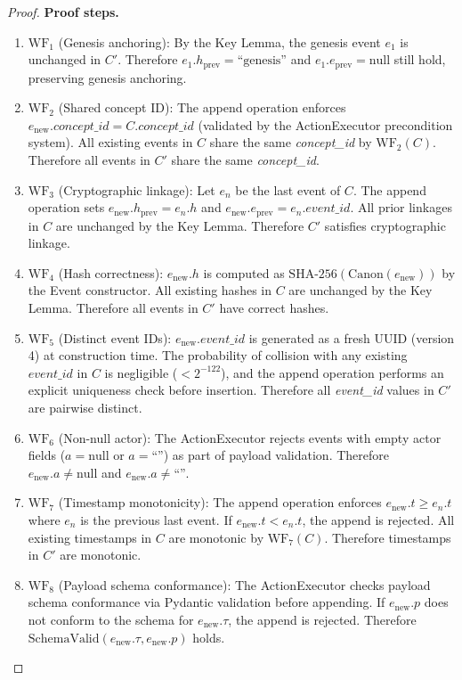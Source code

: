 \begin{proof}
\textbf{Proof steps.}
\begin{enumerate}[label=Step~\arabic*:,leftmargin=2em]
    \item $\text{WF}_1$ (Genesis anchoring): By the Key Lemma, the genesis event $e_1$ is unchanged in $C'$. Therefore $e_1.h_{\text{prev}} = \text{``genesis''}$ and $e_1.e_{\text{prev}} = \text{null}$ still hold, preserving genesis anchoring.
    \item $\text{WF}_2$ (Shared concept ID): The append operation enforces $e_{\text{new}}.\textit{concept\_id} = C.\textit{concept\_id}$ (validated by the ActionExecutor precondition system). All existing events in $C$ share the same \textit{concept\_id} by $\text{WF}_2(C)$. Therefore all events in $C'$ share the same \textit{concept\_id}.
    \item $\text{WF}_3$ (Cryptographic linkage): Let $e_n$ be the last event of $C$. The append operation sets $e_{\text{new}}.h_{\text{prev}} = e_n.h$ and $e_{\text{new}}.e_{\text{prev}} = e_n.\textit{event\_id}$. All prior linkages in $C$ are unchanged by the Key Lemma. Therefore $C'$ satisfies cryptographic linkage.
    \item $\text{WF}_4$ (Hash correctness): $e_{\text{new}}.h$ is computed as $\text{SHA-256}(\text{Canon}(e_{\text{new}}))$ by the Event constructor. All existing hashes in $C$ are unchanged by the Key Lemma. Therefore all events in $C'$ have correct hashes.
    \item $\text{WF}_5$ (Distinct event IDs): $e_{\text{new}}.\textit{event\_id}$ is generated as a fresh UUID (version 4) at construction time. The probability of collision with any existing $\textit{event\_id}$ in $C$ is negligible ($< 2^{-122}$), and the append operation performs an explicit uniqueness check before insertion. Therefore all \textit{event\_id} values in $C'$ are pairwise distinct.
    \item $\text{WF}_6$ (Non-null actor): The ActionExecutor rejects events with empty actor fields ($a = \text{null}$ or $a = \text{``''}$) as part of payload validation. Therefore $e_{\text{new}}.a \neq \text{null}$ and $e_{\text{new}}.a \neq \text{``''}$.
    \item $\text{WF}_7$ (Timestamp monotonicity): The append operation enforces $e_{\text{new}}.t \geq e_n.t$ where $e_n$ is the previous last event. If $e_{\text{new}}.t < e_n.t$, the append is rejected. All existing timestamps in $C$ are monotonic by $\text{WF}_7(C)$. Therefore timestamps in $C'$ are monotonic.
    \item $\text{WF}_8$ (Payload schema conformance): The ActionExecutor checks payload schema conformance via Pydantic validation before appending. If $e_{\text{new}}.p$ does not conform to the schema for $e_{\text{new}}.\tau$, the append is rejected. Therefore $\text{SchemaValid}(e_{\text{new}}.\tau, e_{\text{new}}.p)$ holds.

\end{enumerate}
\end{proof}
